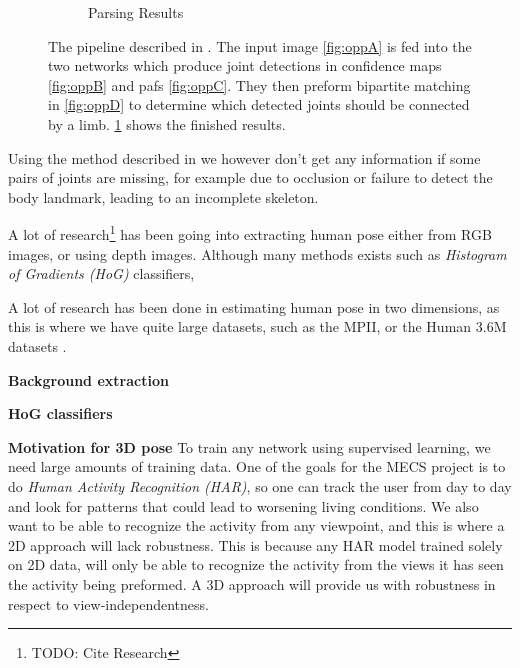 \begin{figure}[h]
\begin{subfigure}[t]{0.24\textwidth}
    \label{fig:oppE}
    \caption{Parsing Results}
  \end{subfigure}
  \caption{The pipeline described in \cite{cao2017realtime}. The input image
    \ref{fig:oppA} is fed into the two networks which produce joint detections in
    confidence maps \ref{fig:oppB} and \gls{paf}s \ref{fig:oppC}. They then preform
    bipartite matching in \ref{fig:oppD} to determine which detected joints should be
    connected by a limb. \ref{fig:oppE} shows the finished results.}
  \label{fig:openpose_pipeline}
\end{figure}

Using the method described in \cite{cao2017realtime} we however don't get any information if some pairs of joints are missing, for example due to occlusion or failure to detect the body landmark, leading to an incomplete skeleton.


A lot of research\footnote{TODO: Cite Research} has been going into extracting human pose either from RGB images, or using depth images. Although many methods exists such as \emph{Histogram of Gradients (HoG)} classifiers,

A lot of research has been done in estimating human pose in two dimensions, as this is where we have quite large datasets, such as the MPII, or the Human 3.6M datasets \cite{andriluka14cvpr,h36m_pami}.

\textbf{Background extraction}

\textbf{HoG classifiers}


\textbf{Motivation for 3D pose} To train any network using supervised learning, we need large amounts of training data. One of the goals for the MECS project is to do \emph{Human Activity Recognition (HAR)}, so one can track the user from day to day and look for patterns that could lead to worsening living conditions. We also want to be able to recognize the activity from any viewpoint, and this is where a 2D approach will lack robustness. This is because any HAR model trained solely on 2D data, will only be able to recognize the activity from the views it has seen the activity being preformed. A 3D approach will provide us with robustness in respect to view-independentness.


